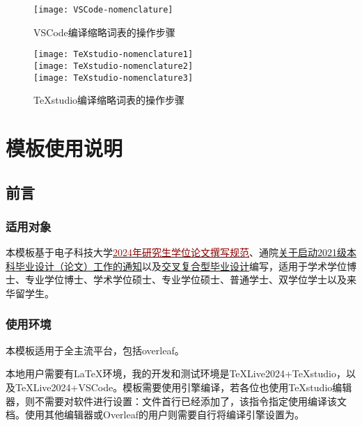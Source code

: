 \documentclass[print, doctor, vlined]{DissertUESTC}
\begin{document}
	\begin{figure}[!htb]
		\centering
		\texttt{[image: VSCode-nomenclature]}
		\caption{VSCode编译缩略词表的操作步骤} \label{fig: VScode编译缩略词表}
	\end{figure}
	\begin{figure}[!htb]
		\centering
		\texttt{[image: TeXstudio-nomenclature1]}
		\\
		\texttt{[image: TeXstudio-nomenclature2]}
		\\
		\texttt{[image: TeXstudio-nomenclature3]}
		\caption{TeXstudio编译缩略词表的操作步骤} \label{fig: TeXstudio编译缩略词表}
	\end{figure}
	
	

	\chapter{模板使用说明}

	\section{前言}
	\subsection{适用对象}
	
	本模板基于电子科技大学\href{https://gr.uestc.edu.cn/xiazai/114/3917}{\textcolor{DarkRed}{2024年研究生学位论文撰写规范}}、通院\href{https://www.sice.uestc.edu.cn/info/1140/14689.htm}{\color{DarkRed}关于启动2021级本科毕业设计（论文）工作的通知}以及\href{https://www.jwc.uestc.edu.cn/info/1507170256521551874}{\color{DarkRed}交叉复合型毕业设计}编写，适用于学术学位博士、专业学位博士、学术学位硕士、专业学位硕士、普通学士、双学位学士以及来华留学生。

	\subsection{使用环境}

	本模板适用于全主流平台，包括overleaf。

	本地用户需要有LaTeX环境，我的开发和测试环境是TeXLive2024+TeXstudio，以及TeXLive2024+VSCode。模板需要使用引擎编译，若各位也使用TeXstudio编辑器，则不需要对软件进行设置：文件首行已经添加了，该指令指定使用编译该文档。使用其他编辑器或Overleaf的用户则需要自行将编译引擎设置为。
\end{document}
